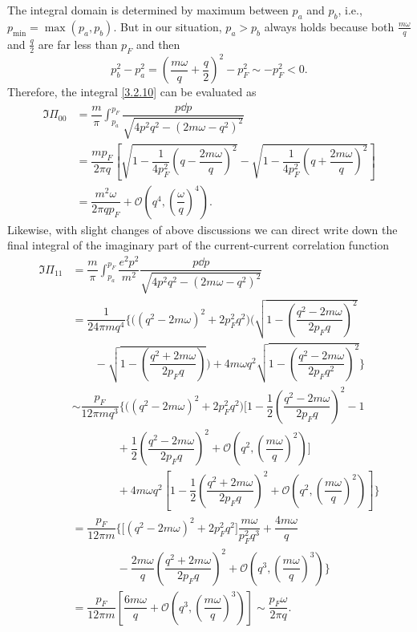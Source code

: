 \documentclass[bachelor,english,numbers]{ustcthesis}
\begin{document}
		The integral domain is determined by maximum between $p_a$ and $p_b$, i.e., $p_{\text{min}}=\max(p_a,p_b)$. But in our situation, $p_a>p_b$ always holds because both $\frac{m\omega}{q}$ and $\frac{q}{2}$ are far less than $p_F$ and then
		\begin{equation*}
			p_b^2-p_a^2=\left(\dfrac{m\omega}{q}+\dfrac{q}{2}\right)^2-p_F^2\sim -p_F^2<0.
		\end{equation*}
		Therefore, the integral \eqref{3.2.10} can be evaluated as
		\begin{align}
			\Im \Pi_{00}&=\dfrac{m}{\pi}\int_{p_a}^{p_F}\dfrac{p\dd p}{\sqrt{4p^2q^2-(2m\omega-q^2)^2}}\nonumber\\
			&=\dfrac{mp_F}{2\pi q}\left[\sqrt{1-\dfrac{1}{4p_F^2}\left(q-\dfrac{2m\omega}{q}\right)^2}-\sqrt{1-\dfrac{1}{4p_F^2}\left(q+\dfrac{2m\omega}{q}\right)^2}\right]\nonumber\\
			&=\dfrac{m^2\omega}{2\pi q p_F}+\mathcal{O}\left(q^4,\left(\dfrac{\omega}{q}\right)^4\right).\label{3.2.11}
		\end{align}
		Likewise, with slight changes of above discussions we can direct write down the final integral of the imaginary part of the current-current correlation function
		\begin{align}
			\Im \Pi_{11}&=\dfrac{m}{\pi}\int_{p_a}^{p_F}\dfrac{e^2p^2}{m^2}\dfrac{p\dd p}{\sqrt{4p^2q^2-(2m\omega-q^2)^2}}\nonumber\\
			&=\dfrac{1}{24\pi mq^4}\Bigg\{\bigg((q^2-2m\omega)^2+2p_F^2q^2\bigg)\Bigg(\sqrt{1-\left(\dfrac{q^2-2m\omega}{2p_Fq}\right)^2}\nonumber\\
			&\qquad-\sqrt{1-\left(\dfrac{q^2+2m\omega}{2p_Fq}\right)}\Bigg)+4m\omega q^2\sqrt{1-\left(\dfrac{q^2-2m\omega}{2p_Fq^2}\right)^2}\Bigg\}\nonumber\\
			&\sim\dfrac{p_F}{12\pi mq^3}\Bigg\{\bigg((q^2-2m\omega)^2+2p_F^2q^2\bigg)\Bigg[1-\dfrac{1}{2}\left(\dfrac{q^2-2m\omega}{2p_Fq}\right)^2-1\nonumber\\
			&\qquad\qquad+\dfrac{1}{2}\left(\dfrac{q^2-2m\omega}{2p_Fq}\right)^2+\mathcal{O}\left(q^2,\left(\dfrac{m\omega}{q}\right)^2\right)\Bigg]\nonumber\\
			&\qquad\qquad +4m\omega q^2\left[1-\dfrac{1}{2}\left(\dfrac{q^2+2m\omega}{2p_Fq}\right)^2+\mathcal{O}\left(q^2,\left(\dfrac{m\omega}{q}\right)^2\right)\right]\Bigg\}\nonumber\\
			&=\dfrac{p_F}{12\pi m}\Bigg\{\bigg[(q^2-2m\omega)^2+2p_F^2q^2\bigg]\dfrac{m\omega}{p_F^2q^3}+\dfrac{4m\omega}{q}\nonumber\\
			&\qquad\qquad-\dfrac{2m\omega}{q}\left(\dfrac{q^2+2m\omega}{2p_Fq}\right)^2+\mathcal{O}\left(q^3,\left(\dfrac{m\omega}{q}\right)^3\right)\Bigg\}\nonumber\\
			&=\dfrac{p_F}{12\pi m}\left[\dfrac{6m\omega}{q}+\mathcal{O}\left(q^3,\left(\dfrac{m\omega}{q}\right)^3\right)\right]\sim\dfrac{p_F \omega}{2\pi q}.\label{3.2.12}
		\end{align}
		
\end{document}
